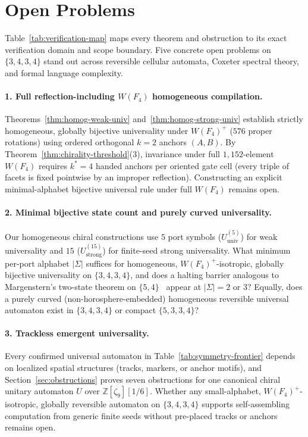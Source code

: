 \section{Open Problems}
\label{sec:open-problems}

Table~\ref{tab:verification-map} maps every theorem and obstruction to its exact verification domain and scope boundary. Five concrete open problems on $\{3,4,3,4\}$ stand out across reversible cellular automata, Coxeter spectral theory, and formal language complexity.

\paragraph{1. Full reflection-including $W(F_4)$ homogeneous compilation.}
Theorems~\ref{thm:homog-weak-univ} and~\ref{thm:homog-strong-univ} establish strictly homogeneous, globally bijective universality under $W(F_4)^+$ ($576$ proper rotations) using ordered orthogonal $k = 2$ anchors $(A,B)$. By Theorem~\ref{thm:chirality-threshold}(3), invariance under full $1{,}152$-element $W(F_4)$ requires $k^* = 4$ handed anchors per oriented gate cell (every triple of facets is fixed pointwise by an improper reflection). Constructing an explicit minimal-alphabet bijective universal rule under full $W(F_4)$ remains open.

\paragraph{2. Minimal bijective state count and purely curved universality.}
Our homogeneous chiral constructions use $5$ port symbols ($U_{\mathrm{univ}}^{(5)}$) for weak universality and $15$ ($U_{\mathrm{strong}}^{(15)}$) for finite-seed strong universality. What minimum per-port alphabet $|\Sigma|$ suffices for homogeneous, $W(F_4)^+$-isotropic, globally bijective universality on $\{3,4,3,4\}$, and does a halting barrier analogous to Margenstern's two-state theorem on $\{5,4\}$~\cite{margenstern2018halting} appear at $|\Sigma| = 2$ or $3$? Equally, does a purely curved (non-horosphere-embedded) homogeneous reversible universal automaton exist in $\{3,4,3,4\}$ or compact $\{5,3,3,4\}$?

\paragraph{3. Trackless emergent universality.}
Every confirmed universal automaton in Table~\ref{tab:symmetry-frontier} depends on localized spatial structures (tracks, markers, or anchor motifs), and Section~\ref{sec:obstructions} proves seven obstructions for one canonical chiral unitary automaton $U$ over $\mathbb{Z}[\zeta_9][1/6]$. Whether any small-alphabet, $W(F_4)^+$-isotropic, globally reversible automaton on $\{3,4,3,4\}$ supports self-assembling computation from generic finite seeds without pre-placed tracks or anchors remains open.

